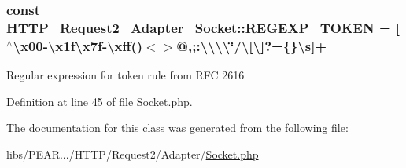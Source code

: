 \hypertarget{classHTTP__Request2__Adapter__Socket_a56beacc9218c6048c7f9ad5af80959eb}{}
\subsubsection[{R\+E\+G\+E\+X\+P\+\_\+\+T\+O\+K\+E\+N}]{\setlength{\rightskip}{0pt plus 5cm}const H\+T\+T\+P\+\_\+\+Request2\+\_\+\+Adapter\+\_\+\+Socket\+::\+R\+E\+G\+E\+X\+P\+\_\+\+T\+O\+K\+E\+N = \textquotesingle{}\mbox{[}$^\wedge$\textbackslash{}x00-\/\textbackslash{}x1f\textbackslash{}x7f-\/\textbackslash{}xff()$<$$>$@,;\+:\textbackslash{}\textbackslash{}\textbackslash{}\textbackslash{}\char`\"{}/\textbackslash{}\mbox{[}\textbackslash{}\mbox{]}?=\{\}\textbackslash{}s\mbox{]}+\textquotesingle{}}\label{classHTTP__Request2__Adapter__Socket_a56beacc9218c6048c7f9ad5af80959eb}
Regular expression for \textquotesingle{}token\textquotesingle{} rule from R\+F\+C 2616 

Definition at line 45 of file Socket.\+php.



The documentation for this class was generated from the following file\+:\begin{DoxyCompactItemize}
\item 
libs/\+P\+E\+A\+R.../\+H\+T\+T\+P/\+Request2/\+Adapter/\hyperlink{Socket_8php}{Socket.\+php}\end{DoxyCompactItemize}
